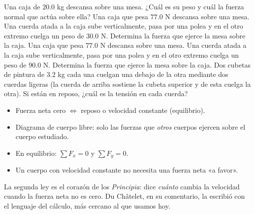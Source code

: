 \documentclass[11pt]{article}
\begin{document}
\begin{preguntas}
\pregunta Una caja de $\num{20,0}$ kg descansa sobre una mesa. ¿Cuál es su peso y cuál la
fuerza normal que actúa sobre ella?
\espacio{2cm}
\pregunta Una caja que pesa $\num{77,0}$ N descansa sobre una mesa. Una cuerda atada a la caja
sube verticalmente, pasa por una polea y en el otro extremo cuelga un peso de $\num{30,0}$ N.
Determina la fuerza que ejerce la mesa sobre la caja.
\espacio{2.5cm}
\pregunta Una caja que pesa $\num{77,0}$ N descansa sobre una mesa. Una cuerda atada a la caja
sube verticalmente, pasa por una polea y en el otro extremo cuelga un peso de $\num{90,0}$ N.
Determina la fuerza que ejerce la mesa sobre la caja.
\espacio{2.5cm}
\pregunta Dos cubetas de pintura de $\num{3,2}$ kg cada una cuelgan una debajo de la otra
mediante dos cuerdas ligeras (la cuerda de arriba sostiene la cubeta superior y de esta cuelga
la otra). Si están en reposo, ¿cuál es la tensión en cada cuerda?
\espacio{3cm}
\end{preguntas}

\begin{resumen}
\begin{itemize}
  \item Fuerza neta cero $\Leftrightarrow$ reposo o velocidad constante (equilibrio).
  \item Diagrama de cuerpo libre: solo las fuerzas que \emph{otros} cuerpos ejercen sobre el
        cuerpo estudiado.
  \item En equilibrio: $\sum F_x = 0$ y $\sum F_y = 0$.
  \item Un cuerpo con velocidad constante no necesita una fuerza neta «a favor».
\end{itemize}
\end{resumen}

\label{tema:segundaley}

\begin{hilo}
La segunda ley es el corazón de los \emph{Principia}: dice \emph{cuánto} cambia la velocidad
cuando la fuerza neta no es cero. Du Châtelet, en su comentario, la escribió con el lenguaje
del cálculo, más cercano al que usamos hoy.
\end{hilo}
\end{document}
